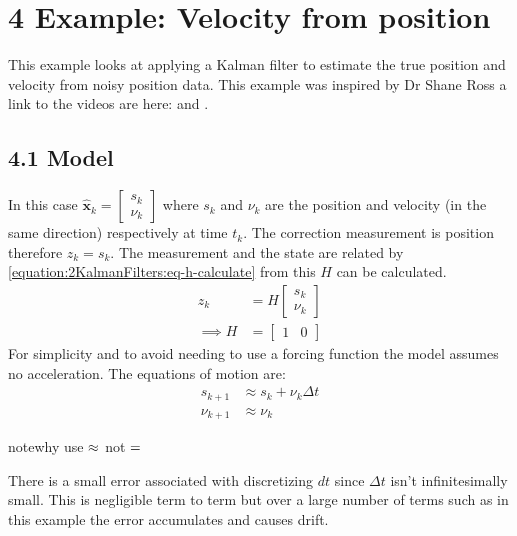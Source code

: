 \documentclass[letterpaper,10pt,english]{jupyterBook}
\begin{document}
\sphinxstepscope


\chapter{4 Example: Velocity from position}
\label{\detokenize{4ExampleVelocityFromPosition:example-velocity-from-position}}\label{\detokenize{4ExampleVelocityFromPosition::doc}}
\sphinxAtStartPar
This example looks at applying a Kalman filter to estimate the true position and velocity from noisy position data. This example was inspired by Dr Shane Ross a link to the videos are here:  and .


\section{4.1 Model}
\label{\detokenize{4ExampleVelocityFromPosition:model}}
\sphinxAtStartPar
In this case \(\hat{\boldsymbol{x}}_k = \begin{bmatrix} s_k \\ \nu_k \end{bmatrix}\) where \(s_k\) and \(\nu_k\) are the position and velocity (in the same direction) respectively at time \(t_k\).  The correction measurement is position therefore \(z_k = s_k\). The measurement and the state are related by \eqref{equation:2KalmanFilters:eq-h-calculate} from this \(H\) can be calculated.
\begin{equation}\label{equation:4ExampleVelocityFromPosition:H}
\begin{split}z_k &= H \begin{bmatrix} s_k \\ \nu_k \end{bmatrix} \\
\implies H &= \begin{bmatrix} 1 & 0 \end{bmatrix}\end{split}
\end{equation}
\sphinxAtStartPar
For simplicity and to avoid needing to use a forcing function the model assumes no acceleration. The equations of motion are:
\begin{equation}\label{equation:4ExampleVelocityFromPosition:eq-motion-equations}
\begin{split}s_{k+1} &\approx s_k + \nu_k\Delta t \\
\nu_{k+1} &\approx \nu_k\end{split}
\end{equation}
\begin{sphinxadmonition}{note}{why use \protect\(\approx\protect\) not \protect\(=\protect\)}

\sphinxAtStartPar
There is a small error associated with discretizing \(dt\) since \(\Delta t\) isn’t infinitesimally small. This is negligible term to term but over a large number of terms such as in this example the error accumulates and causes drift.
\end{sphinxadmonition}
\end{document}
